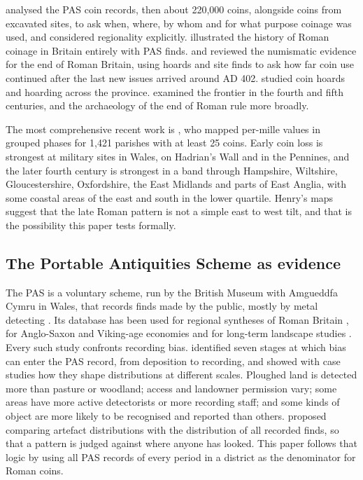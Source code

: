 \documentclass[11pt,a4paper]{article}
\begin{document}
\citet{walton2012} analysed the PAS coin records, then about 220,000 coins, alongside coins from excavated sites, to ask when, where, by whom and for what purpose coinage was used, and considered regionality explicitly. \citet{moorhead2013} illustrated the history of Roman coinage in Britain entirely with PAS finds. \citet{moorhead2014} and \citet{walton2016} reviewed the numismatic evidence for the end of Roman Britain, using hoards and site finds to ask how far coin use continued after the last new issues arrived around AD 402. \citet{bland2018} studied coin hoards and hoarding across the province. \citet{collins2012} examined the frontier in the fourth and fifth centuries, and \citet{gerrard2013} the archaeology of the end of Roman rule more broadly.

The most comprehensive recent work is \citet{henry2024}, who mapped per-mille values in grouped phases for 1,421 parishes with at least 25 coins. Early coin loss is strongest at military sites in Wales, on Hadrian's Wall and in the Pennines, and the later fourth century is strongest in a band through Hampshire, Wiltshire, Gloucestershire, Oxfordshire, the East Midlands and parts of East Anglia, with some coastal areas of the east and south in the lower quartile. Henry's maps suggest that the late Roman pattern is not a simple east to west tilt, and that is the possibility this paper tests formally.

\subsection{The Portable Antiquities Scheme as evidence}
The PAS is a voluntary scheme, run by the British Museum with Amgueddfa Cymru in Wales, that records finds made by the public, mostly by metal detecting \citep{bland2005,bland2017,lewis2016}. Its database has been used for regional syntheses of Roman Britain \citep{brindle2013,brindle2014}, for Anglo-Saxon and Viking-age economies \citep{richards2009} and for long-term landscape studies \citep{cooper2016}. Every such study confronts recording bias. \citet{robbins2012} identified seven stages at which bias can enter the PAS record, from deposition to recording, and \citet{robbins2013} showed with case studies how they shape distributions at different scales. Ploughed land is detected more than pasture or woodland; access and landowner permission vary; some areas have more active detectorists or more recording staff; and some kinds of object are more likely to be recognised and reported than others. \citet{bevan2012} proposed comparing artefact distributions with the distribution of all recorded finds, so that a pattern is judged against where anyone has looked. This paper follows that logic by using all PAS records of every period in a district as the denominator for Roman coins.
\end{document}
